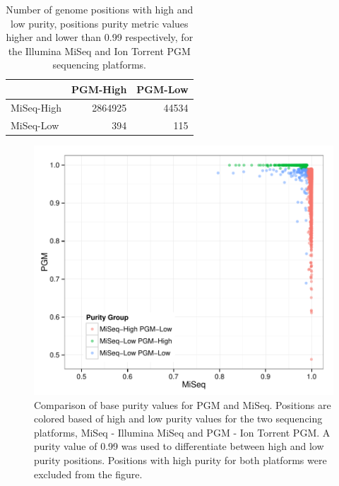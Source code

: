 \documentclass[smallextended]{svjour3}\usepackage[]{graphicx}\usepackage[]{color}
\makeatletter
\def\maxwidth{ %
  \ifdim\Gin@nat@width>\linewidth
    \linewidth
  \else
    \Gin@nat@width
  \fi
}
\newenvironment{knitrout}{}{} %
\makeatother
\begin{document}
\begin{table}[ht]
\centering
\begin{tabular}{lrr}
  \hline
  & PGM-High & PGM-Low \\ 
  \hline
MiSeq-High & 2864925 & 44534 \\ 
  MiSeq-Low & 394 & 115 \\ 
   \hline
\end{tabular}
\caption{Number of genome positions with high and low purity, positions purity metric values higher and lower than 0.99 respectively, for the Illumina MiSeq and Ion Torrent PGM sequencing platforms.} 
\label{Table:purityTable}
\end{table}



\begin{knitrout}
\color{fgcolor}\begin{figure}

{\centering \includegraphics[width=\maxwidth]{figure/purityScatterFig-1} 

}

\caption[Comparison of base purity values for PGM and MiSeq]{Comparison of base purity values for PGM and MiSeq. Positions are colored based of high and low purity values for the two sequencing platforms, MiSeq - Illumina MiSeq and PGM - Ion Torrent PGM. A purity value of 0.99 was used to differentiate between high and low purity positions. Positions with high purity for both platforms were excluded from the figure.}\label{fig:purityScatterFig}
\end{figure}


\end{knitrout}
\end{document}

